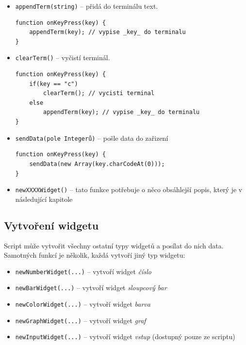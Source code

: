 \documentclass[12pt, a4paper, oneside]{article}
\newcommand{\It}{\textit}  %
\begin{document}
\begin{itemize}
    \item {\color{blue}\verb/appendTerm(string)/} -- přidá do terminálu text.
        \begin{lstlisting}[caption=Vypsání stisknutých kláves do terminálu]
function onKeyPress(key) {
    appendTerm(key); // vypise _key_ do terminalu
}
        \end{lstlisting}

    \item {\color{blue}\verb/clearTerm()/} -- vyčistí terminál.
        \begin{lstlisting}[caption=Vypsání stisknutých kláves do terminálu a jeho vyčištění po stisku klávesy C]
function onKeyPress(key) {
    if(key == "c")
        clearTerm(); // vycisti terminal
    else
        appendTerm(key); // vypise _key_ do terminalu
}
        \end{lstlisting}

    \item {\color{blue}\verb/sendData(pole Integerů)/} -- pošle data do zařizení
        \begin{lstlisting}[caption=Poslání ASCII kódu stisknuté klávesy]
function onKeyPress(key) {
    sendData(new Array(key.charCodeAt(0)));
}
        \end{lstlisting}

    \item {\color{blue}\verb/newXXXXWidget()/} -- tato funkce potřebuje o něco obsáhlejší popis, který je v následující kapitole
\end{itemize}

\subsection*{Vytvoření widgetu}

Script může vytvořit všechny ostatní typy widgetů a posílat do nich data. Samotných funkcí je několik, každá vytvoří jiný typ widgetu:
\begin{itemize}
    \item {\color{blue}\verb/newNumberWidget(...)/} -- vytvoří widget \It{číslo}
    \item {\color{blue}\verb/newBarWidget(...)/} -- vytvoří widget \It{sloupcový bar}
    \item {\color{blue}\verb/newColorWidget(...)/} -- vytvoří widget \It{barva}
    \item {\color{blue}\verb/newGraphWidget(...)/} -- vytvoří widget \It{graf}
    \item {\color{blue}\verb/newInputWidget(...)/} -- vytvoří widget \It{vstup} (dostupný pouze ze scriptu)
\end{itemize}
\end{document}
